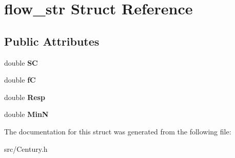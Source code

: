 \hypertarget{structflow__str}{\section{flow\-\_\-str Struct Reference}
\label{structflow__str}
}
\subsection*{Public Attributes}
\begin{DoxyCompactItemize}
\item 
\hypertarget{structflow__str_a41a71554da03371699f429d307974247}{double {\bfseries S\-C}}\label{structflow__str_a41a71554da03371699f429d307974247}

\item 
\hypertarget{structflow__str_a7f91c96b51e8914c71b78dcfddfd8dac}{double {\bfseries f\-C}}\label{structflow__str_a7f91c96b51e8914c71b78dcfddfd8dac}

\item 
\hypertarget{structflow__str_a45d3078b3c5f3d7494e05110d080a5ae}{double {\bfseries Resp}}\label{structflow__str_a45d3078b3c5f3d7494e05110d080a5ae}

\item 
\hypertarget{structflow__str_a163d2de258396ecad6f447871f09802c}{double {\bfseries Min\-N}}\label{structflow__str_a163d2de258396ecad6f447871f09802c}

\end{DoxyCompactItemize}


The documentation for this struct was generated from the following file\-:\begin{DoxyCompactItemize}
\item 
src/Century.\-h\end{DoxyCompactItemize}
